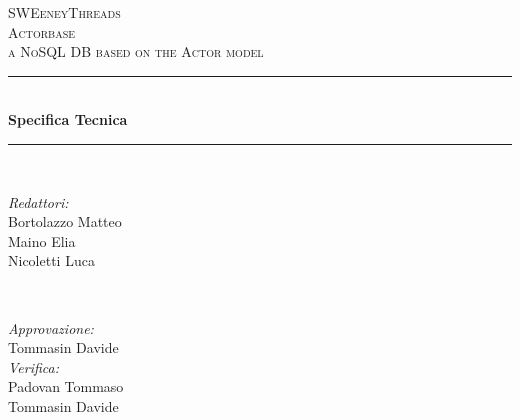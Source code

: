 \documentclass[a4paper]{article}
\begin{document}
	
	\begin{titlepage}
		\newcommand{\HRule}{\rule{\linewidth}{0.5mm}} 
		\center  
		
		\textsc{\LARGE SWEeneyThreads}\\[1.5cm] 
		\textsc{\Large Actorbase}\\[0.5cm] 
		\textsc{\large a NoSQL DB based on the Actor model}\\[0.5cm]
		
		
		\HRule \\[0.4cm]
		{ \huge \bfseries Specifica Tecnica}\\[0.4cm] 
		\HRule \\[1.5cm]
		
		\begin{minipage}{0.4\textwidth}
			\begin{flushleft} \large
				\emph{Redattori:}\\
				Bortolazzo Matteo \\
				Maino Elia \\
				Nicoletti Luca  \\
			\end{flushleft}
		\end{minipage}
		~
		\begin{minipage}{0.4\textwidth}
			\begin{flushright} \large
				\emph{Approvazione:} \\
                    Tommasin Davide\\
				\emph{Verifica:} \\
                    Padovan Tommaso\\
                    Tommasin Davide \\
				 
			\end{flushright}
		\end{minipage}
		

\end{titlepage}
\end{document}

